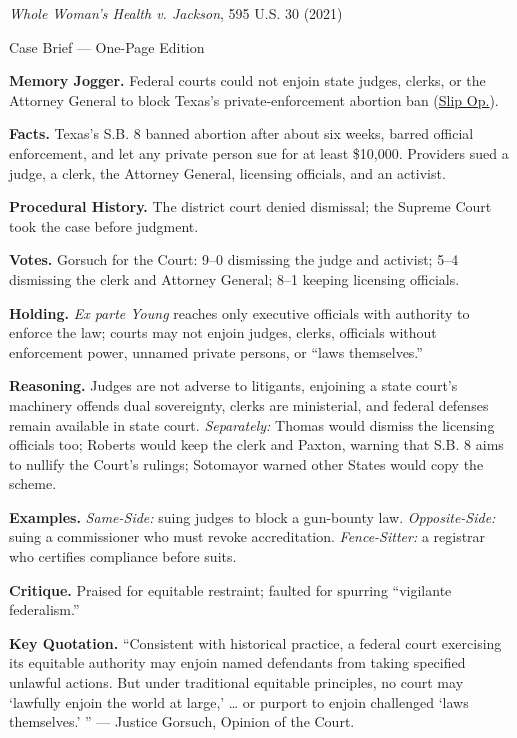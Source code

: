 \documentclass[12pt]{article}
\begin{document}
\begin{center}
{\Large \textit{Whole Woman's Health v. Jackson}, 595 U.S. 30 (2021)\par}
\vspace{0.3em}
{\normalsize Case Brief --- One-Page Edition\par}
\end{center}

\textbf{Memory Jogger.} Federal courts could not enjoin state judges, clerks, or the Attorney General to block Texas's private-enforcement abortion ban (\href{https://www.supremecourt.gov/opinions/21pdf/21-463_3ebh.pdf}{Slip Op.}).

\textbf{Facts.} Texas's S.B. 8 banned abortion after about six weeks, barred official enforcement, and let any private person sue for at least \$10,000. Providers sued a judge, a clerk, the Attorney General, licensing officials, and an activist.

\textbf{Procedural History.} The district court denied dismissal; the Supreme Court took the case before judgment.

\textbf{Votes.} Gorsuch for the Court: 9--0 dismissing the judge and activist; 5--4 dismissing the clerk and Attorney General; 8--1 keeping licensing officials.

\textbf{Holding.} \textit{Ex parte Young} reaches only executive officials with authority to enforce the law; courts may not enjoin judges, clerks, officials without enforcement power, unnamed private persons, or ``laws themselves.''

\textbf{Reasoning.} Judges are not adverse to litigants, enjoining a state court's machinery offends dual sovereignty, clerks are ministerial, and federal defenses remain available in state court. \emph{Separately:} Thomas would dismiss the licensing officials too; Roberts would keep the clerk and Paxton, warning that S.B. 8 aims to nullify the Court's rulings; Sotomayor warned other States would copy the scheme.

\textbf{Examples.} \emph{Same-Side:} suing judges to block a gun-bounty law. \emph{Opposite-Side:} suing a commissioner who must revoke accreditation. \emph{Fence-Sitter:} a registrar who certifies compliance before suits.

\textbf{Critique.} Praised for equitable restraint; faulted for spurring ``vigilante federalism.''

\textbf{Key Quotation.} ``Consistent with historical practice, a federal court exercising its equitable authority may enjoin named defendants from taking specified unlawful actions. But under traditional equitable principles, no court may `lawfully enjoin the world at large,' \dots{} or purport to enjoin challenged `laws themselves.' '' --- Justice Gorsuch, Opinion of the Court.
\end{document}
